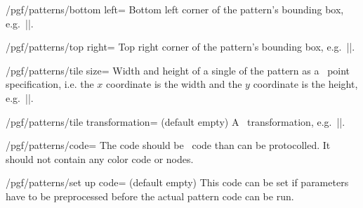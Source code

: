 \begin{command}{\pgfdeclarepattern{}}
\begin{key}{/pgf/patterns/bottom left=}
    Bottom left corner of the pattern's bounding box, e.g.\
    |\pgfqpoint{-.1pt}{-.1pt}|.
\end{key}
\begin{key}{/pgf/patterns/top right=}
    Top right corner of the pattern's bounding box, e.g.\
    |\pgfqpoint{3.1pt}{3.1pt}|.
\end{key}
\begin{key}{/pgf/patterns/tile size=}
    Width and height of a single of the pattern as a \pgfname\ point
    specification, i.e. the $x$ coordinate is the width and the $y$ coordinate
    is the height, e.g.\ |\pgfqpoint{3pt}{3pt}|.
\end{key}
\begin{key}{/pgf/patterns/tile transformation= (default empty)}
    A \pgfname\ transformation, e.g.\ ||.
\end{key}
\begin{key}{/pgf/patterns/code=}
    The code should be \pgfname\ code than can be protocolled. It should not
    contain any color code or nodes.
\end{key}
\begin{key}{/pgf/patterns/set up code= (default empty)}
    This code can be set if parameters have to be preprocessed before the
    actual pattern code can be run.
\end{key}
\end{command}

